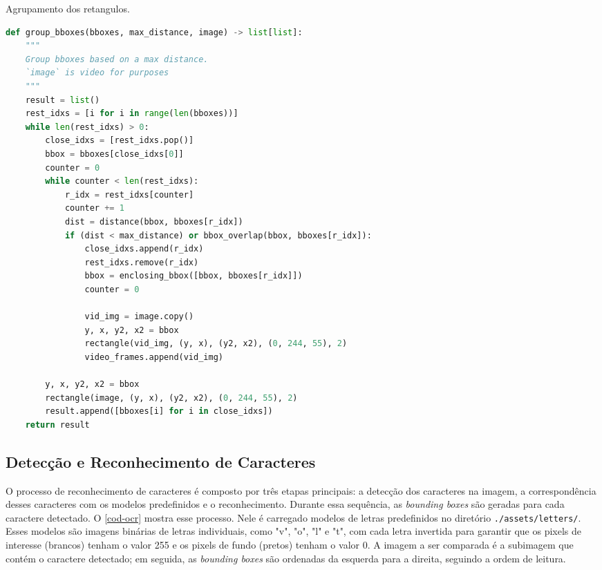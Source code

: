 \documentclass[english, 
               brazil, 
               bsc] %
               {dcomp-abntex2}
\begin{document}
\begin{codigo}[h]
  \caption{\small Agrupamento dos retangulos.}
 \label{cod-group_bboxes}
\begin{lstlisting}[language=python]
def group_bboxes(bboxes, max_distance, image) -> list[list]:
    """
    Group bboxes based on a max distance.
    `image` is video for purposes
    """
    result = list()
    rest_idxs = [i for i in range(len(bboxes))]
    while len(rest_idxs) > 0:
        close_idxs = [rest_idxs.pop()]
        bbox = bboxes[close_idxs[0]]
        counter = 0
        while counter < len(rest_idxs):
            r_idx = rest_idxs[counter]
            counter += 1
            dist = distance(bbox, bboxes[r_idx])
            if (dist < max_distance) or bbox_overlap(bbox, bboxes[r_idx]):
                close_idxs.append(r_idx)
                rest_idxs.remove(r_idx)
                bbox = enclosing_bbox([bbox, bboxes[r_idx]])
                counter = 0

                vid_img = image.copy()
                y, x, y2, x2 = bbox
                rectangle(vid_img, (y, x), (y2, x2), (0, 244, 55), 2)
                video_frames.append(vid_img)

        y, x, y2, x2 = bbox
        rectangle(image, (y, x), (y2, x2), (0, 244, 55), 2)
        result.append([bboxes[i] for i in close_idxs])
    return result
\end{lstlisting}
\end{codigo}

\subsection{Detecção e Reconhecimento de Caracteres}


O processo de reconhecimento de caracteres é composto por três etapas principais: a detecção dos caracteres na imagem, a correspondência desses caracteres com os modelos predefinidos e o reconhecimento. Durante essa sequência, as \textit{bounding boxes} são geradas para cada caractere detectado. O \autoref{cod-ocr} mostra esse processo. Nele é carregado modelos de letras predefinidos no diretório \texttt{./assets/letters/}. Esses modelos são imagens binárias de letras individuais, como "v", "o", "l" e "t", com cada letra invertida para garantir que os pixels de interesse (brancos) tenham o valor 255 e os pixels de fundo (pretos) tenham o valor 0. A imagem a ser comparada é a subimagem que contém o caractere detectado; em seguida, as \textit{bounding boxes} são ordenadas da esquerda para a direita, seguindo a ordem de leitura.
\end{document}
